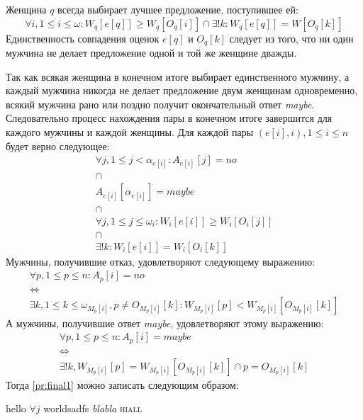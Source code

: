\documentclass{article}
\begin{document}
Женщина \( q \) всегда выбирает лучшее предложение, поступившее ей:
\begin{displaymath}
\forall i, 1 \leq i \leq \omega : W_q[e[q]] \geq W_q[O_q[i]] \cap \exists ! k : W_q[e[q]] = W[O_q[k]]
\end{displaymath}
Единственность совпадения оценок \( e[q] \) и \( O_q[k] \) следует из того, что ни один мужчина не делает предложение одной и той же женщине
дважды.

Так как всякая женщина в конечном итоге выбирает единственного мужчину, а каждый мужчина никогда не делает предложение двум женщинам одновременно,
всякий мужчина рано или поздно получит окончательный ответ \emph{maybe}. Следовательно процесс нахождения пары в конечном итоге завершится для каждого
мужчины и каждой женщины. Для каждой пары \( (e[i],i), 1 \leq i \leq n \) будет верно следующее:
\begin{equation}
    \label{pr:final1}
    \begin{array}{c}
    \forall j, 1 \leq j < \alpha_{e[i]} : A_{e[i]}[j] = no \\
    \cap \\
    A_{e[i]}[\alpha_{e[i]}] = maybe \\
    \cap \\
    \forall j, 1 \leq j \leq \omega_i : W_i[e[i]] \geq W_i[O_i[j]] \\
    \cap \\
    \exists ! k : W_i[e[i]] = W_i[O_i[k]]
    \end{array}
\end{equation}
Мужчины, получившие отказ, удовлетворяют следующему выражению:
\begin{displaymath}
\begin{array}{c}
\forall p, 1 \leq p \leq n : A_p[i] = no \\
\Leftrightarrow \\
\exists k, 1 \leq k \leq \omega_{M_p[i]}, p \neq O_{M_p[i]}[k] : W_{M_p[i]}[p] < W_{M_p[i]}[O_{M_p[i]}[k]]
\end{array}
\end{displaymath}
А мужчины, получившие ответ \emph{maybe}, удовлетворяют этому выражению:
\begin{displaymath}
\begin{array}{c}
\forall p, 1 \leq p \leq n : A_p[i] = maybe \\
\Leftrightarrow \\
\exists ! k, W_{M_p[i]}[p] = W_{M_p[i]}[O_{M_p[i]}[k]] \cap p = O_{M_p[i]}[k]
\end{array}
\end{displaymath}
Тогда \ref{pr:final1} можно записать следующим образом:
\begin{equaton}
    
\end{equaton}

{
    \ttfamily
    hello
    \( \forall j \)
    worldsadfs
    \emph{blabla}
    \textsc{hiall}
}
\end{document}
